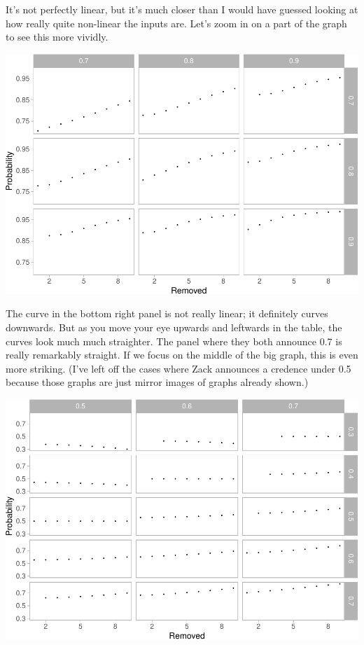 \documentclass[
  12pt,
]{article}
\begin{document}
It's not perfectly linear, but it's much closer than I would have
guessed looking at how really quite non-linear the inputs are. Let's
zoom in on a part of the graph to see this more vividly.

\includegraphics{mixing-experts-not-anon_files/figure-latex/unnamed-chunk-3-1.pdf}

The curve in the bottom right panel is not really linear; it definitely
curves downwards. But as you move your eye upwards and leftwards in the
table, the curves look much much straighter. The panel where they both
announce 0.7 is really remarkably straight. If we focus on the middle of
the big graph, this is even more striking. (I've left off the cases
where Zack announces a credence under 0.5 because those graphs are just
mirror images of graphs already shown.)

\includegraphics{mixing-experts-not-anon_files/figure-latex/unnamed-chunk-4-1.pdf}
\end{document}
